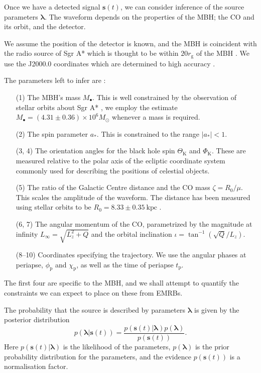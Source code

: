 \documentclass[useAMS,usedcolumn,usegraphicx,usenatbib]{mn2e}
\begin{document}
Once we have a detected signal $\boldsymbol{s}(t)$, we can consider inference of the source parameters $\boldsymbol{\lambda}$. The waveform depends on the properties of the MBH; the CO and its orbit, and the detector.

We assume the position of the detector is known, and the MBH is coincident with the radio source of Sgr A* which is thought to be within $20 r_\mathrm{g}$ of the MBH \citep{Reid2003,Doeleman2008}. We use the J2000.0 coordinates which are determined to high accuracy \citep{Reid1999, Yusef-Zadeh1999}.

The parameters left to infer are \citep{Berry2013}:
\begin{enumerate}
\item[(1)] The MBH's mass $M_\bullet$. This is well constrained by the observation of stellar orbits about Sgr A* \citep{Ghez2008, Gillessen2009}, we employ the estimate $M_\bullet = (4.31 \pm 0.36) \times 10^6 M_\odot$ whenever a mass is required.
\item[(2)] The spin parameter $a_\ast$. This is constrained to the range $|a_\ast| < 1$.
\item[(3, 4)] The orientation angles for the black hole spin $\Theta_\mathrm{K}$ and $\Phi_\mathrm{K}$. These are measured relative to the polar axis of the ecliptic coordinate system commonly used for describing the positions of celestial objects.
\item[(5)] The ratio of the Galactic Centre distance and the CO mass $\zeta = R_0/\mu$. This scales the amplitude of the waveform. The distance has been measured using stellar orbits to be $R_0 = 8.33 \pm 0.35~\mathrm{kpc}$ \citep{Gillessen2009}.
\item[(6, 7)] The angular momentum of the CO, parametrized by the magnitude at infinity $L_\infty = \sqrt{L_z^2 + Q}$ and the orbital inclination $\iota = \tan^{-1}(\sqrt{Q}/L_z)$.
\item[(8--10)] Coordinates specifying the trajectory. We use the angular phases at periapse, $\phi_\mathrm{p}$ and $\chi_\mathrm{p}$, as well as the time of periapse $t_\mathrm{p}$.
\end{enumerate}
The first four are specific to the MBH, and we shall attempt to quantify the constraints we can expect to place on these from EMRBs.

The probability that the source is described by parameters $\boldsymbol{\lambda}$ is given by the posterior distribution
\begin{equation}
p(\boldsymbol{\lambda}|\boldsymbol{s}(t)) = \frac{p(\boldsymbol{s}(t)|\boldsymbol{\lambda})p(\boldsymbol{\lambda})}{p(\boldsymbol{s}(t))}.
\end{equation}
Here $p(\boldsymbol{s}(t)|\boldsymbol{\lambda})$ is the likelihood of the parameters, $p(\boldsymbol{\lambda})$ is the prior probability distribution for the parameters, and the evidence $p(\boldsymbol{s}(t))$ is a normalisation factor.
\end{document}
